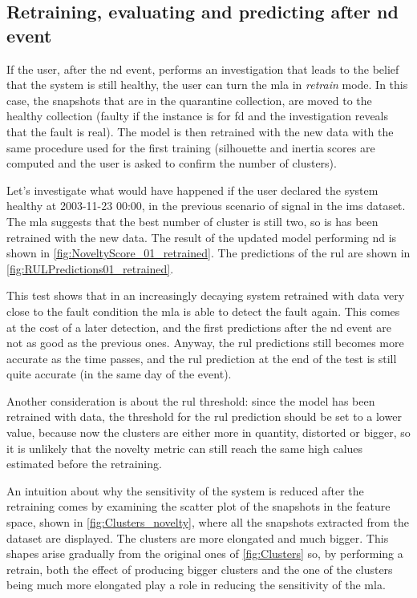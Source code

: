 \subsection{Retraining,  evaluating and predicting after \gls{nd} event}
If the user, after the \gls{nd} event, performs an investigation that leads to the belief that the system is still healthy, the user can turn the \gls{mla} in \emph{retrain} mode. In this case, the snapshots that are in the quarantine collection, are moved to the healthy collection (faulty if the instance is for \gls{fd} and the investigation reveals that the fault is real). 
The model is then retrained with the new data with the same procedure used for the first training (silhouette and inertia scores are computed and the user is asked to confirm the number of clusters).

Let's investigate what would have happened if the user declared the system healthy at 2003-11-23 00:00, in the previous scenario of   signal in the \gls{ims} dataset. The \gls{mla} suggests that the best number of cluster is still two, so is has been retrained with the new data. The result of the updated model performing \gls{nd} is shown in \autoref{fig:NoveltyScore_01_retrained}. The predictions of the \gls{rul} are shown in \autoref{fig:RULPredictions01_retrained}. 

This test shows that in an increasingly decaying system retrained with data very close to the fault condition the \gls{mla} is able to detect the fault again. This comes at the cost of a later detection, and the first predictions after the \gls{nd} event are not as good as the previous ones. Anyway, the \gls{rul} predictions still becomes more accurate as the time passes, and the \gls{rul} prediction at the end of the test is still quite accurate (in the same day of the event). 

Another consideration is about the \gls{rul} threshold: since the model has been retrained with  data, the threshold for the \gls{rul} prediction should be set to a lower value, because now the clusters are either more in quantity, distorted or bigger, so it is unlikely that the novelty metric can still reach the same high calues estimated before the retraining.

An intuition about why the sensitivity of the system is reduced after the retraining comes by examining the scatter plot of the snapshots in the feature space, shown in \autoref{fig:Clusters_novelty}, where all the snapshots extracted from the dataset are displayed. The clusters are more elongated and much bigger. This shapes arise gradually from the original ones of \autoref{fig:Clusters} so, by performing a retrain, both the effect of producing bigger clusters and the one of the clusters being much more elongated play a role in reducing the sensitivity of the \gls{mla}.

